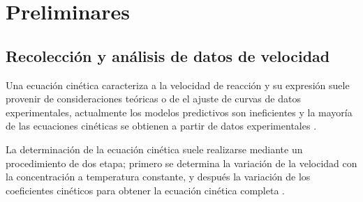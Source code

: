 \documentclass[../master.tex]{subfiles}
\begin{document}
    \section{Preliminares}

    \subsection{Recolección y análisis de datos de velocidad}

    Una ecuación cinética caracteriza a la velocidad de reacción y su expresión suele provenir de consideraciones teóricas o de el ajuste de curvas de datos experimentales, actualmente los modelos predictivos son ineficientes y la mayoría de las ecuaciones cinéticas se obtienen a partir de datos experimentales \parencite{levenspiel1}.

    La determinación de la ecuación cinética suele realizarse mediante un procedimiento de dos etapa; primero se determina la variación de la velocidad con la concentración a temperatura constante, y después la variación de los coeficientes cinéticos para obtener la ecuación cinética completa \parencite{levenspiel1}.

    
\end{document}
